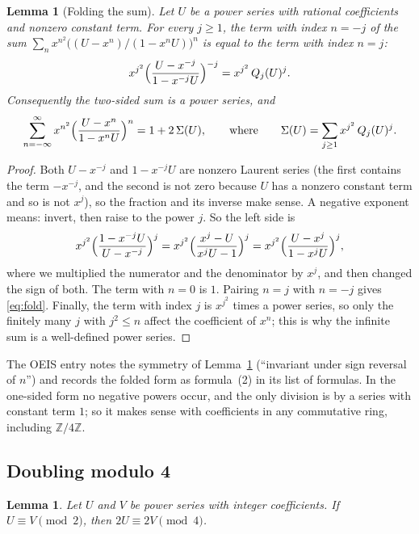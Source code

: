 \documentclass[11pt,a4paper]{article}
\newtheorem{lemma}[theorem]{Lemma}
\theoremstyle{definition}
\theoremstyle{remark}
\newcommand{\Z}{\mathbb{Z}}
\begin{document}
\begin{lemma}[Folding the sum]\label{lem:fold}
Let $U$ be a power series with rational coefficients and nonzero constant term. For every $j\ge1$, the term with index
$n=-j$ of the sum $\sum_{n}x^{n^2}\bigl((U-x^n)/(1-x^nU)\bigr)^n$ is equal to the term with index $n=j$:
\[
x^{j^2}\Bigl(\frac{U-x^{-j}}{1-x^{-j}U}\Bigr)^{-j}=x^{j^2}\,Q_j(U)^j .
\]
Consequently the two-sided sum is a power series, and
\begin{equation}\label{eq:fold}
\sum_{n=-\infty}^{\infty}x^{n^2}\Bigl(\frac{U-x^n}{1-x^nU}\Bigr)^n=1+2\,\Sigma(U),
\qquad\text{where}\qquad
\Sigma(U)=\sum_{j\ge1}x^{j^2}\,Q_j(U)^j .
\end{equation}
\end{lemma}

\begin{proof}
Both $U-x^{-j}$ and $1-x^{-j}U$ are nonzero Laurent series (the first contains the term $-x^{-j}$, and the second is
not zero because $U$ has a nonzero constant term and so is not $x^j$), so the fraction and its inverse make sense. A negative
exponent means: invert, then raise to the power $j$. So the left side is
\[
x^{j^2}\Bigl(\frac{1-x^{-j}U}{U-x^{-j}}\Bigr)^{j}
=x^{j^2}\Bigl(\frac{x^j-U}{x^jU-1}\Bigr)^{j}
=x^{j^2}\Bigl(\frac{U-x^j}{1-x^jU}\Bigr)^{j},
\]
where we multiplied the numerator and the denominator by $x^j$, and then changed the sign of both. The term with
$n=0$ is $1$. Pairing $n=j$ with $n=-j$ gives \eqref{eq:fold}. Finally, the term with index $j$ is $x^{j^2}$ times a
power series, so only the finitely many $j$ with $j^2\le n$ affect the coefficient of $x^n$; this is why the infinite
sum is a well-defined power series.
\end{proof}

The OEIS entry notes the symmetry of Lemma~\ref{lem:fold} (``invariant under sign reversal of $n$'') and records the
folded form as formula~(2) in its list of formulas. In the one-sided form no negative powers occur, and the only division is by a
series with constant term $1$; so it makes sense with coefficients in any commutative ring, including $\Z/4\Z$.

\subsection{Doubling modulo 4}
\begin{lemma}\label{lem:double}
Let $U$ and $V$ be power series with integer coefficients. If $U\equiv V\pmod 2$, then $2U\equiv2V\pmod 4$.
\end{lemma}
\end{document}

